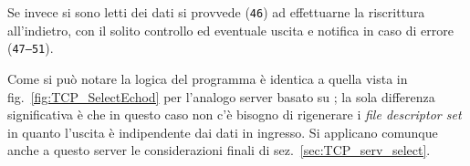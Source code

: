 Se invece si sono letti dei dati si provvede (\texttt{\small 46}) ad
effettuarne la riscrittura all'indietro, con il solito controllo ed eventuale
uscita e notifica in caso di errore (\texttt{\small 47--51}).

Come si può notare la logica del programma è identica a quella vista in
fig.~\ref{fig:TCP_SelectEchod} per l'analogo server basato su ;
la sola differenza significativa è che in questo caso non c'è bisogno di
rigenerare i \textit{file descriptor set} in quanto l'uscita è indipendente
dai dati in ingresso. Si applicano comunque anche a questo server le
considerazioni finali di sez.~\ref{sec:TCP_serv_select}.







